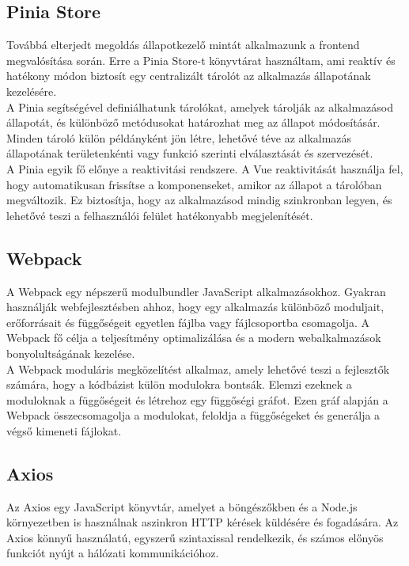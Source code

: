 \documentclass[a4paper,twoside]{article}
\begin{document}
\subsection{Pinia Store}
Továbbá elterjedt megoldás állapotkezelő mintát alkalmazunk a frontend megvalósítása
során. Erre a Pinia Store\cite{pinia}-t könyvtárat használtam, ami reaktív és hatékony módon
biztosít egy centralizált tárolót az alkalmazás állapotának kezelésére.
\\

A Pinia segítségével definiálhatunk tárolókat, amelyek tárolják az alkalmazásod állapotát,
és különböző metódusokat határozhat meg az állapot módosításár. Minden tároló külön
példányként jön létre, lehetővé téve az alkalmazás állapotának területenkénti vagy funkció
szerinti elválasztását és \mbox{szervezését}.
\\

A Pinia egyik fő előnye a reaktivitási rendszere. A Vue reaktivitását használja fel, hogy
automatikusan frissítse a komponenseket, amikor az állapot a tárolóban megváltozik. Ez
biztosítja, hogy az alkalmazásod mindig szinkronban legyen, és lehetővé teszi a
felhasználói felület hatékonyabb megjelenítését.
\subsection{Webpack}
A Webpack\cite{webpack} egy népszerű modulbundler JavaScript alkalmazásokhoz. Gyakran
használják webfejlesztésben ahhoz, hogy egy alkalmazás különböző moduljait,
erőforrásait és függőségeit egyetlen fájlba vagy fájlcsoportba csomagolja. A Webpack fő
célja a teljesítmény optimalizálása és a modern webalkalmazások bonyolultságának
kezelése.
\\

A Webpack moduláris megközelítést alkalmaz, amely lehetővé teszi a fejlesztők számára,
hogy a kódbázist külön modulokra bontsák. Elemzi ezeknek a moduloknak a függőségeit
és létrehoz egy függőségi gráfot. Ezen gráf alapján a Webpack összecsomagolja a
modulokat, feloldja a függőségeket és generálja a végső kimeneti fájlokat.
\subsection{Axios}
Az Axios\cite{axios} egy JavaScript könyvtár, amelyet a böngészőkben és a Node.js környezetben
is használnak aszinkron HTTP kérések küldésére és fogadására. Az Axios könnyű
használatú, egyszerű szintaxissal rendelkezik, és számos előnyös funkciót nyújt a hálózati
kommunikációhoz.
\end{document}
